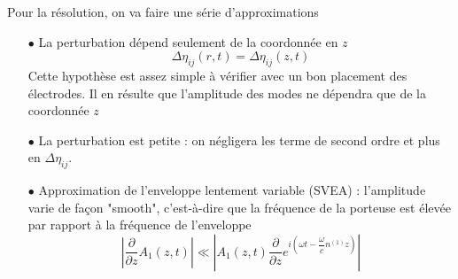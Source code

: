 Pour la résolution, on va faire une série d'approximations
\begin{itemize}
\item[$\bullet$] La perturbation dépend seulement de la coordonnée en $z$
\begin{equation}
\Delta \eta_{ij}(r,t)=\Delta \eta_{ij}(z,t)
\end{equation}
Cette hypothèse est assez simple à vérifier avec un bon placement des électrodes. Il en résulte que 
l'amplitude des modes ne dépendra que de la coordonnée $z$
\item[$\bullet$] La perturbation est petite : on négligera les terme de second ordre et plus en 
$\Delta \eta_{ij}$.
\item[$\bullet$] Approximation de l'enveloppe lentement variable (SVEA) : l'amplitude varie de 
façon "smooth", c'est-à-dire que la fréquence de la porteuse est élevée par rapport à la fréquence
de l'enveloppe
\begin{equation}
\left|\dfrac{\partial}{\partial z} A_1(z,t)\right| \ll \left|A_1(z,t)\dfrac{\partial}{\partial z} e^{i\left(
\omega t-\dfrac{\omega}{c}n^{(1)}z\right)}\right|
\end{equation}
\end{itemize}

